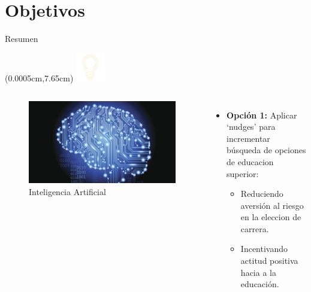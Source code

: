 \documentclass[english,spanish,aspectratio=169,11 pt,utf8]{beamer}	%
\numberwithin{table}{section}
\numberwithin{figure}{section}
\theoremstyle{definition}
\theoremstyle{plain}
\theoremstyle{plain}
\theoremstyle{plain}
\begin{document}
\section{Objetivos}

\begin{frame}{Resumen} %
	\begin{textblock*}{1.5cm}(0.0005cm,7.65cm) %
		\includegraphics[width=1.25cm]{header_foco.jpg}
	\end{textblock*}
	\begin{columns}[c] %
		\begin{figure}
			\includegraphics[width=\textwidth,height=0.7\textheight,keepaspectratio]{artificial-inteligence.jpg}
			\caption{Inteligencia Artificial}
		\end{figure}
		\begin{itemize}
			\item \textbf{Opción 1:} Aplicar `nudges' para incrementar búsqueda de opciones de educacion superior:
					\begin{itemize}
					\item Reduciendo aversión al riesgo en la eleccion de carrera.
					\item Incentivando actitud positiva hacia a la educación.
					\end{itemize}


\end{itemize}
\end{columns}
\end{frame}
\end{document}

